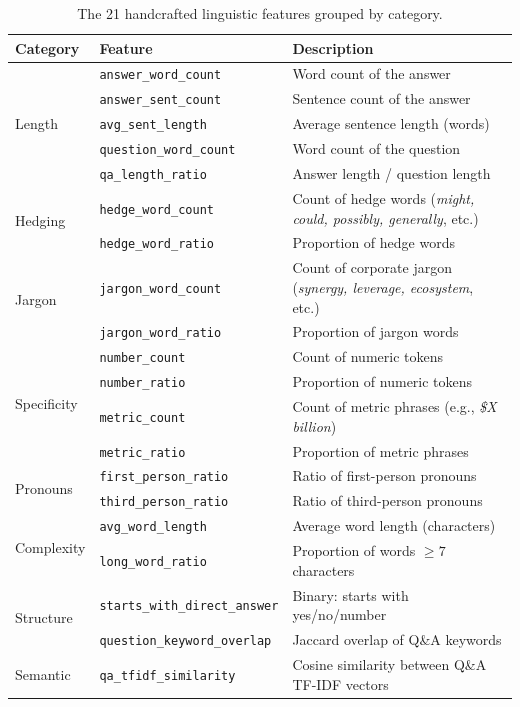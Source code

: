 \documentclass[12pt]{article}
\begin{document}
\begin{table}[H]
\centering
\caption{The 21 handcrafted linguistic features grouped by category.}
\label{tab:features}
\small
\begin{tabular}{llp{6.5cm}}
\toprule
\textbf{Category} & \textbf{Feature} & \textbf{Description} \\
\midrule
\multirow{5}{*}{Length}
    & \texttt{answer\_word\_count}      & Word count of the answer \\
    & \texttt{answer\_sent\_count}      & Sentence count of the answer \\
    & \texttt{avg\_sent\_length}        & Average sentence length (words) \\
    & \texttt{question\_word\_count}    & Word count of the question \\
    & \texttt{qa\_length\_ratio}        & Answer length / question length \\
\midrule
\multirow{2}{*}{Hedging}
    & \texttt{hedge\_word\_count}       & Count of hedge words (\emph{might, could, possibly, generally}, etc.) \\
    & \texttt{hedge\_word\_ratio}       & Proportion of hedge words \\
\midrule
\multirow{2}{*}{Jargon}
    & \texttt{jargon\_word\_count}      & Count of corporate jargon (\emph{synergy, leverage, ecosystem}, etc.) \\
    & \texttt{jargon\_word\_ratio}      & Proportion of jargon words \\
\midrule
\multirow{4}{*}{Specificity}
    & \texttt{number\_count}            & Count of numeric tokens \\
    & \texttt{number\_ratio}            & Proportion of numeric tokens \\
    & \texttt{metric\_count}            & Count of metric phrases (e.g., \emph{\$X billion}) \\
    & \texttt{metric\_ratio}            & Proportion of metric phrases \\
\midrule
\multirow{2}{*}{Pronouns}
    & \texttt{first\_person\_ratio}     & Ratio of first-person pronouns \\
    & \texttt{third\_person\_ratio}     & Ratio of third-person pronouns \\
\midrule
\multirow{2}{*}{Complexity}
    & \texttt{avg\_word\_length}        & Average word length (characters) \\
    & \texttt{long\_word\_ratio}        & Proportion of words $\geq 7$ characters \\
\midrule
\multirow{2}{*}{Structure}
    & \texttt{starts\_with\_direct\_answer} & Binary: starts with yes/no/number \\
    & \texttt{question\_keyword\_overlap}   & Jaccard overlap of Q\&A keywords \\
\midrule
Semantic
    & \texttt{qa\_tfidf\_similarity}    & Cosine similarity between Q\&A TF-IDF vectors \\
\bottomrule
\end{tabular}
\end{table}
\end{document}
